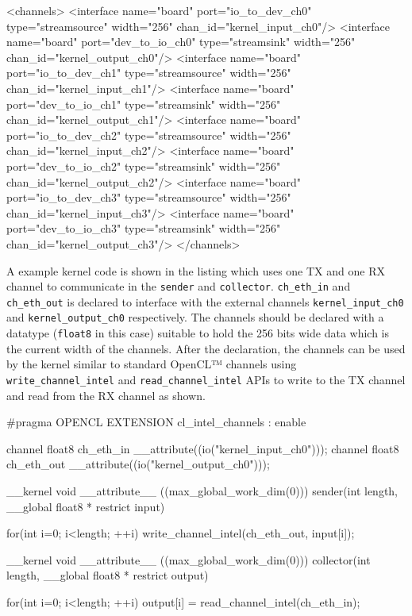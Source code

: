\begin{XmlCode}
<channels>
    <interface name="board" port="io_to_dev_ch0" type="streamsource" width="256" chan_id="kernel_input_ch0"/>
    <interface name="board" port="dev_to_io_ch0" type="streamsink" width="256" chan_id="kernel_output_ch0"/>
    <interface name="board" port="io_to_dev_ch1" type="streamsource" width="256" chan_id="kernel_input_ch1"/>
    <interface name="board" port="dev_to_io_ch1" type="streamsink" width="256" chan_id="kernel_output_ch1"/>
    <interface name="board" port="io_to_dev_ch2" type="streamsource" width="256" chan_id="kernel_input_ch2"/>
    <interface name="board" port="dev_to_io_ch2" type="streamsink" width="256" chan_id="kernel_output_ch2"/>
    <interface name="board" port="io_to_dev_ch3" type="streamsource" width="256" chan_id="kernel_input_ch3"/>
    <interface name="board" port="dev_to_io_ch3" type="streamsink" width="256" chan_id="kernel_output_ch3"/>
</channels>
\end{XmlCode}
A example kernel code is shown in the listing {} which uses one TX and one RX channel to
communicate in the \texttt{sender} and \texttt{collector}.
\texttt{ch\_eth\_in} and \texttt{ch\_eth\_out} is declared to interface with 
the external channels \texttt{kernel\_input\_ch0} and \texttt{kernel\_output\_ch0} respectively.
The channels should be declared with a datatype (\texttt{float8} in this case)
suitable to hold the 256 bits wide data which is the current width of the channels.
After the declaration, the channels can be used by the kernel similar to standard OpenCL™
channels using \texttt{write\_channel\_intel} and \texttt{read\_channel\_intel} APIs to write
to the TX channel and read from the RX channel as shown.

\begin{CppCode}
#pragma OPENCL EXTENSION cl_intel_channels : enable

channel float8 ch_eth_in __attribute((io("kernel_input_ch0")));
channel float8 ch_eth_out __attribute((io("kernel_output_ch0")));

__kernel void __attribute__ ((max_global_work_dim(0)))
sender(int length, __global float8 * restrict input)
{

    for(int i=0; i<length; ++i)
        write_channel_intel(ch_eth_out, input[i]);
        
    
}

__kernel void __attribute__ ((max_global_work_dim(0)))
collector(int length, __global float8 * restrict output)
{

    for(int i=0; i<length; ++i)
        output[i] = read_channel_intel(ch_eth_in);

}
\end{CppCode}



